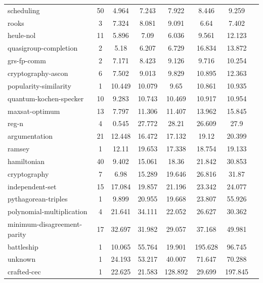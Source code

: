 \documentclass[12pt,a4paper,twoside]{scrartcl}
\numberwithin{equation}{section}
\begin{document}
\begin{longtable}{ lccccccc }
  scheduling	                    &	50	&	4.964	&	7.243	&	7.922	&	8.446	&	9.259       \\
  rooks	                          &	3	&	7.324	&	8.081	&	9.091	&	6.64	&	7.402       \\
  heule-nol	                      &	11	&	5.896	&	7.09	&	6.036	&	9.561	&	12.123      \\
  quasigroup-completion	          &	2	&	5.18	&	6.207	&	6.729	&	16.834	&	13.872      \\
  grs-fp-comm	                    &	2	&	7.171	&	8.423	&	9.126	&	9.716	&	10.254      \\
  cryptography-ascon	            &	6	&	7.502	&	9.013	&	9.829	&	10.895	&	12.363      \\
  popularity-similarity	          &	1	&	10.449	&	10.079	&	9.65	&	10.861	&	10.935      \\
  quantum-kochen-specker	        &	10	&	9.283	&	10.743	&	10.469	&	10.917	&	10.954      \\
  maxsat-optimum	                &	13	&	7.797	&	11.306	&	11.407	&	13.962	&	15.845      \\
  reg-n	                          &	4	&	0.545	&	27.772	&	28.21	&	26.609	&	27.9        \\
  argumentation	                  &	21	&	12.448	&	16.472	&	17.132	&	19.12	&	20.399      \\
  ramsey	                        &	1	&	12.11	&	19.653	&	17.338	&	18.754	&	19.133      \\
  hamiltonian	                    &	40	&	9.402	&	15.061	&	18.36	&	21.842	&	30.853      \\
  cryptography	                  &	7	&	6.98	&	15.289	&	19.646	&	26.816	&	31.87       \\
  independent-set	                &	15	&	17.084	&	19.857	&	21.196	&	23.342	&	24.077      \\
  pythagorean-triples	            &	1	&	9.899	&	20.955	&	19.668	&	23.807	&	55.926      \\
  polynomial-multiplication	      &	4	&	21.641	&	34.111	&	22.052	&	26.627	&	30.362      \\
  minimum-disagreement-parity	    &	17	&	32.697	&	31.982	&	29.057	&	37.168	&	49.981      \\
  battleship	                    &	1	&	10.065	&	55.764	&	19.901	&	195.628	&	96.745      \\
  unknown	                        &	1	&	24.193	&	53.217	&	40.007	&	71.647	&	70.288      \\
  crafted-cec	                    &	1	&	22.625	&	21.583	&	128.892	&	29.699	&	197.845     \\

\end{longtable}
\end{document}

